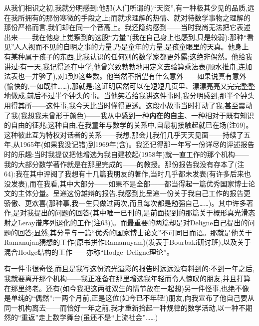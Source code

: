 从我们相识之初,我就分明感到:他那(人们所谓的)“天资”,有一种极其少见的品质,远在我所拥有的那份寒微的手段之上;而就求理解的热情、就对待数学事物之理解的那份严格而言,我们却在同一个音高上。我还隐约感到——当时我尚无法把它表述出来——我在他身上觉察到的这股“力量”(我在自己身上也感到,只是较弱):那种“看见”人人视而不见的自明之事的力量,乃是童年的力量,是孩童眼里的天真。他身上有某种属于孩子的东西,比我认识的任何别的数学家都更外露;这绝非偶然。他给我讲过:有一天,我记得还在中学,他曾兴致勃勃地用定义去验算乘法表(顺水推舟,连加法表也一并验了)\dmark{},对1到9这些数。他当然不指望有什么意外——如果说真有意外(愉快的,一如既往……),那就是:这证明居然可以在短短几页里、漂漂亮亮又完完整整地做成,前后不过半个钟头的事。当他笑着给我讲这件事时,我分明感到,那半个钟头用得其所——这件事,我今天比当时懂得更透。这段小故事当时打动了我,甚至震动了我(我想我未曾形于颜色)——我从中感到一种\textbf{内在的自主}、一种相对于既有知识的自由的征兆;这种自由,在我童年与数学的关系中,自最初接触起就已在场(注69)。这种彼此互为特权对话者的关系——我想,那会儿我们几乎天天见面——持续了五年,从1965年(如果我没记错)到1969年(含)。我还记得那一年写一份详尽的评述报告时的乐趣:当时我提议把他增选为我自建校起(1958年)就一直工作的那个机构——我的大部分数学著作就是在那里完成的——的教授。那份报告我没有存本了(注64):我在其中评阅了我想有十几篇我朋友的著作,当时几乎都未发表(有许多后来也没发表),而在我看,其中大部分——如果不是全部——都当得起一篇优秀国家博士论文的主体分量。呈递这份雄辩的报告,我感到比呈递一份关于我自己工作的报告更骄傲、更欢喜(那种事,我一生只做过两次,而且每次都是勉强自己……)。其中许多著作,是对我提出的问题的回答(其中唯一已刊的,是前面提到的那篇关于概形真光滑态射之Leray谱序列退化的工作(注63))。而最重要的两篇\dmark{}却是对Deligne自己提出的问题的回答;显然,其分量与一篇“优秀的国家博士论文”不可同日而语。那就是他关于Ramanujan猜想的工作(原书拼作Ramanuyam)(发表于Bourbaki研讨班),以及关于混合Hodge结构的工作——亦称“Hodge--Deligne理论”。

有一件事很奇怪,而且是我写这份流光溢彩的报告时远远没有料到的:不到一年之后,我就要离开那个机构——我正准备在那里增选我年轻而令人惊叹的朋友,并且打算在那里终老。还有(如今我把这两桩双生的情节放在一起想)另一件怪事,也绝不像是单纯的“偶然”:一两个月前,正是这位(如今已不年轻!)朋友,向我宣布了他自己要从同一机构离去——而恰好一年之前,我才重新拾起一种规律的数学活动,以一种不期然的“重返”走上数学舞台(虽还不是“上流社会”……)

